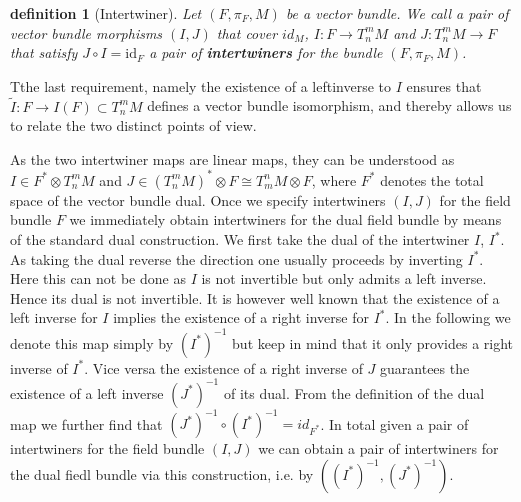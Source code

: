 \documentclass[a4paper,12pt, DIV=14, BCOR=5mm, twoside, headsepline]{scrbook}
\newtheorem{definition}{definition}[section]
\newtheorem*{remark}{Remark}
\begin{document}
\begin{definition}[Intertwiner]
Let $(F,\pi_F,M)$ be a vector bundle. We call a pair of vector bundle morphisms $(I,J)$ that cover $id_M$,
$I: F \rightarrow T^m_n M$ and $J: T^m_n M \rightarrow F $ that satisfy  $J \circ I = \mathrm{id}_F$ a pair of \textbf{\textit{intertwiners}} for the bundle $(F, \pi_F, M)$.
\end{definition}
Tthe last requirement, namely the existence of a leftinverse to $I$ ensures that $\tilde{I} : F \rightarrow I(F) \subset T^m_nM$ defines a vector bundle isomorphism, and thereby allows us to relate the two distinct points of view.

%
%
%
%
%
As the two intertwiner maps are linear maps, they can be understood as $I \in F^{\ast} \otimes T^m_n M$ and $J \in (T^m_nM)^{\ast} \otimes F \cong T^n_m M \otimes F$, where $F^{\ast}$ denotes the total space of the vector bundle dual. 
Once we specify intertwiners $(I,J)$ for the field bundle $F$ we immediately obtain intertwiners for the dual field bundle by means of the standard dual construction. We first take the dual of the intertwiner $I$, $I^{\ast}$. As taking the dual reverse the direction one usually proceeds by inverting $I^{\ast}$. Here this can not be done as $I$ is not invertible but only admits a left inverse. Hence its dual is not invertible. It is however well known that the existence of a left inverse for $I$ implies the existence of a right inverse for $I^{\ast}$. 
%
%
In the following we denote this map simply by $(I^{\ast})^{-1}$ but keep in mind that it only provides a right inverse of $I^{\ast}$. Vice versa the existence of a right inverse of $J$ guarantees the existence of a left inverse $(J^{\ast})^{-1}$ of its dual. From the definition of the dual map we further find that $(J^{\ast})^{-1} \circ (I^{\ast})^{-1} = id_{F^{\ast}}$. In total given a pair of intertwiners for the field bundle $(I,J)$ we can obtain a pair of intertwiners for the dual fiedl bundle via this construction, i.e. by $((I^{\ast})^{-1}, (J^{\ast})^{-1})$. \\
\end{document}
